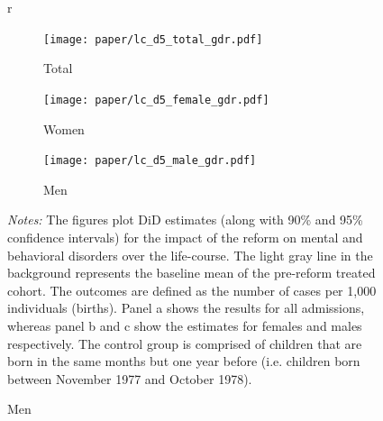 \documentclass[11pt, a4paper,draft]{article} %
\begin{document}
\begin{landscape}
	\vspace*{\fill}
	\begin{figure}[H]\centering
		\caption{Life-course approach for \textbf{mental and behavioral disorders}}\label{fig: lc_d5_frg_DD}r	\begin{subfigure}[h]{0.31\linewidth}\centering\caption{Total}
			\texttt{[image: paper/lc\_d5\_total\_gdr.pdf]}
		\end{subfigure}
		\begin{subfigure}[h]{0.31\linewidth}\centering\caption{Women}
			\texttt{[image: paper/lc\_d5\_female\_gdr.pdf]}
		\end{subfigure}
		\quad
		\begin{subfigure}[h]{0.31\linewidth}\centering\caption{Men}
			\texttt{[image: paper/lc\_d5\_male\_gdr.pdf]}
		\end{subfigure}
		\scriptsize
		\begin{minipage}{\linewidth}
			\emph{Notes:} The figures plot DiD estimates (along with 90\% and 95\% confidence intervals) for the impact of the reform on mental and behavioral disorders over the life-course. The light gray line in the background represents the baseline mean of the pre-reform treated cohort. The outcomes are defined as the number of cases per 1,000 individuals (births). Panel a shows the results for all admissions, whereas panel b and c show the estimates for females and males respectively. The control group is comprised of children	that are born in the same months but one year before (i.e. children born between November 1977 and October 1978).
		\end{minipage}
	\end{figure}
	\vspace*{\fill}\clearpage
\end{landscape}

%
\end{document}
